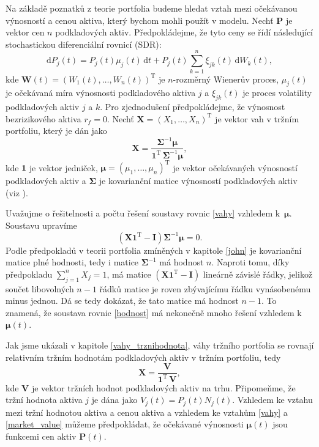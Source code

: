 \documentclass[a4paper,12pt]{report}
\theoremstyle{definition} \newtheorem{definice}[veta]{Definice}
\theoremstyle{remark}
\begin{document}
Na základě poznatků z teorie portfolia budeme hledat vztah mezi očekávanou výnosností a cenou aktiva, který bychom mohli použít v modelu.
Nechť $\boldsymbol{P}$ je vektor cen $n$ podkladových aktiv.
Předpokládejme, že tyto ceny se řídí následující stochastickou diferenciální rovnicí (SDR):
\begin{equation} \label{SDE}
\mathrm{d}P_j(t)=P_j(t)\mu_j(t)\,\mathrm{d}t+P_j(t)\sum_{k=1}^{n}\xi_{jk}(t)\,\mathrm{d}W_k(t),
\end{equation}
kde $\boldsymbol{W}(t)=(W_1(t),\dots,W_n(t))^\mathrm{T}$ je $n$-rozměrný Wienerův proces, $\mu_j(t)$ je očekávaná míra výnosnosti podkladového aktiva $j$ a $\xi_{jk}(t)$ je proces volatility podkladových aktiv $j$ a $k$. 
Pro zjednodušení předpokládejme, že výnosnost bezrizikového aktiva $r_f=0$.
Nechť $\boldsymbol{X}=(X_1,\dots,X_n)^\mathrm{T}$ je vektor vah v tržním portfoliu, který je dán jako
\begin{equation} \label{vahy}
\boldsymbol{X}=\frac{\boldsymbol{\Sigma}^{-1}\boldsymbol{\mu}}{\boldsymbol{1}^\mathrm{T}\,\boldsymbol{\Sigma}^{-1}\boldsymbol{\mu}},
\end{equation}
kde $\boldsymbol{1}$ je vektor jedniček, $\boldsymbol{\mu}=(\mu_1,\dots,\mu_n)^\mathrm{T}$ je vektor očekávaných výnosností podkladových aktiv a $\boldsymbol{\Sigma}$ je kovarianční matice výnosností podkladových aktiv (viz \cite{fabozzi}).

Uvažujme o řešitelnosti a počtu řešení soustavy rovnic \eqref{vahy} vzhledem k~$\boldsymbol{\mu}$.
Soustavu upravíme
\begin{equation} \label{hodnost}
\left(\boldsymbol{X}\boldsymbol{1}^\mathrm{T}-\mathbf{I}\right)\boldsymbol{\Sigma}^{-1}\boldsymbol{\mu}=0.
\end{equation}
Podle předpokladů v teorii portfolia zmíněných v kapitole \ref{john} je kovarianční matice plné hodnosti, tedy i matice $\boldsymbol{\Sigma}^{-1}$ má hodnost $n$.
Naproti tomu, díky předpokladu $\sum_{j=1}^nX_j=1$, má matice $\left(\boldsymbol{X}\boldsymbol{1}^\mathrm{T}-\mathbf{I}\right)$ lineárně závislé řádky, jelikož
součet libovolných $n-1$ řádků matice  je roven zbývajícímu řádku vynásobenému minus jednou.
Dá se tedy dokázat, že tato matice má hodnost $n-1$.
To znamená, že soustava rovnic \eqref{hodnost} má nekonečně mnoho řešení vzhledem k $\boldsymbol{\mu}(t)$.

Jak jsme ukázali v kapitole \ref{vahy_trznihodnota}, váhy tržního portfolia se rovnají relativním tržním hodnotám podkladových aktiv v tržním portfoliu, tedy
\begin{equation} \label{market_value}
\boldsymbol{X}=\frac{\boldsymbol{V}}{\boldsymbol{1}^\mathrm{T}\,\boldsymbol{V}},
\end{equation}
kde $\boldsymbol{V}$ je vektor tržních hodnot podkladových aktiv na trhu.
Připomeňme, že tržní hodnota aktiva $j$ je dána jako $V_j(t)=P_j(t)N_j(t)$.
Vzhledem ke vztahu mezi tržní hodnotou aktiva a cenou aktiva a vzhledem ke vztahům \eqref{vahy} a \eqref{market_value} můžeme předpokládat, že očekávané výnosnosti $\boldsymbol{\mu}(t)$ jsou funkcemi cen aktiv $\boldsymbol{P}(t)$. 
\end{document}
